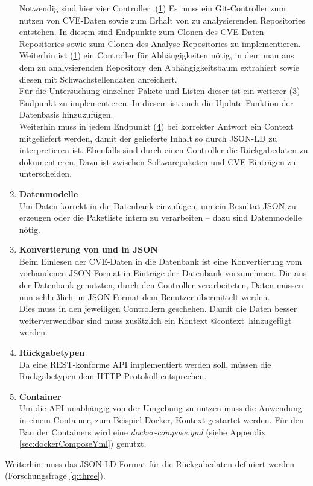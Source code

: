 \begin{enumerate}
            Notwendig sind hier vier Controller.
            (\hyperref[api_controller:one]{1}) Es muss ein Git-Controller zum nutzen von \ac{CVE}-Daten sowie zum Erhalt von zu analysierenden Repositories entstehen.
            In diesem sind Endpunkte zum Clonen des \ac{CVE}-Daten-Repositories sowie zum Clonen des Analyse-Repositories zu implementieren. %
            \\
            Weiterhin ist (\hyperref[api_controller:two]{1}) ein Controller für Abhängigkeiten nötig, in dem man aus dem zu analysierenden Repository den Abhängigkeitsbaum extrahiert sowie diesen mit Schwachstellendaten anreichert.
            \\
            Für die Untersuchung einzelner Pakete und Listen dieser ist ein weiterer (\hyperref[api_controller:three]{3}) Endpunkt zu implementieren.
            In diesem ist auch die Update-Funktion der Datenbasis hinzuzufügen.
            \\
            Weiterhin muss in jedem Endpunkt (\hyperref[api_controller:four]{4}) bei korrekter Antwort ein Context mitgeliefert werden, damit der gelieferte Inhalt so durch \ac{JSON-LD} zu interpretieren ist.
            Ebenfalls sind durch einen Controller die Rückgabedaten zu dokumentieren.
            Dazu ist zwischen Softwarepaketen und \ac{CVE}-Einträgen zu unterscheiden.
        \item \textbf{Datenmodelle} \label{arch_4}\\
            Um Daten korrekt in die Datenbank einzufügen, um ein Resultat-\ac{JSON} zu erzeugen oder die Paketliste intern zu verarbeiten -- dazu sind Datenmodelle nötig.
        \item \textbf{Konvertierung von und in JSON} \label{arch_5}\\
            Beim Einlesen der \ac{CVE}-Daten in die Datenbank ist eine Konvertierung vom vorhandenen \ac{JSON}-Format in Einträge der Datenbank vorzunehmen.
            Die aus der Datenbank genutzten, durch den Controller verarbeiteten, Daten müssen nun schließlich im \ac{JSON}-Format dem Benutzer übermittelt werden.
            \\
            Dies muss in den jeweiligen Controllern geschehen.
            Damit die Daten besser weiterverwendbar sind muss zusätzlich ein Kontext \glqq @context\grqq~hinzugefügt werden.
        \item \textbf{Rückgabetypen} \label{arch_5_1}\\
            Da eine REST-konforme \ac{API} implementiert werden soll, müssen die Rückgabetypen dem HTTP-Protokoll entsprechen.
        \item \textbf{Container} \\
            Um die \ac{API} unabhängig von der Umgebung zu nutzen muss die Anwendung in einem Container, zum Beispiel Docker, Kontext gestartet werden.
            Für den Bau der Containers wird eine \textit{docker-compose.yml} (siehe Appendix \ref{sec:dockerComposeYml}) genutzt.
    \end{enumerate}
    Weiterhin muss das \ac{JSON-LD}-Format für die Rückgabedaten definiert werden (Forschungsfrage \ref{q:three}).

